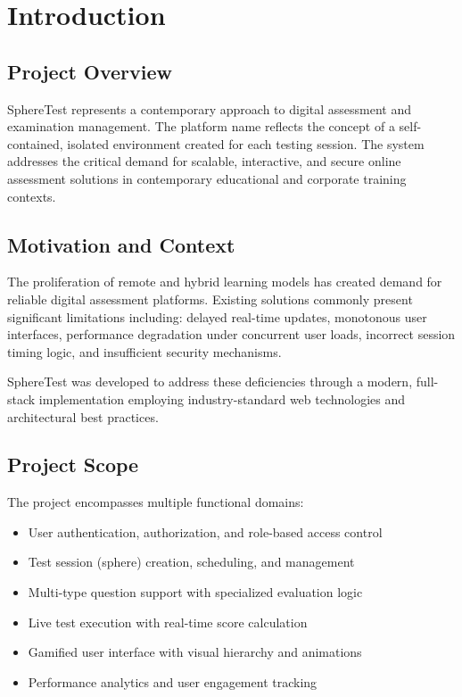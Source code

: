 \documentclass[12pt,a4paper]{report}
\begin{document}

\mainmatter


\chapter{Introduction}

\section{Project Overview}

SphereTest represents a contemporary approach to digital assessment and examination management. The platform name reflects the concept of a self-contained, isolated environment created for each testing session. The system addresses the critical demand for scalable, interactive, and secure online assessment solutions in contemporary educational and corporate training contexts.

\section{Motivation and Context}

The proliferation of remote and hybrid learning models has created demand for reliable digital assessment platforms. Existing solutions commonly present significant limitations including: delayed real-time updates, monotonous user interfaces, performance degradation under concurrent user loads, incorrect session timing logic, and insufficient security mechanisms.

SphereTest was developed to address these deficiencies through a modern, full-stack implementation employing industry-standard web technologies and architectural best practices.

\section{Project Scope}

The project encompasses multiple functional domains:

\begin{itemize}[left=0pt]
  \item User authentication, authorization, and role-based access control
  \item Test session (sphere) creation, scheduling, and management
  \item Multi-type question support with specialized evaluation logic
  \item Live test execution with real-time score calculation
  \item Gamified user interface with visual hierarchy and animations
  \item Performance analytics and user engagement tracking
\end{itemize}
\end{document}
